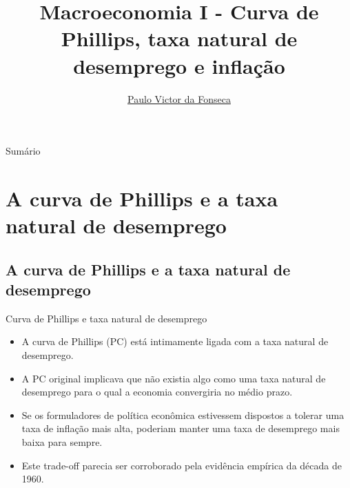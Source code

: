 \documentclass[10pt]{beamer}
\title[]{Macroeconomia I - Curva de Phillips, taxa natural de desemprego e inflação}
\author[]{\href{https://pvfonseca.github.io}{Paulo Victor da Fonseca}}
\date{}
\begin{document}
\begin{frame}[plain]
\end{frame}

\begin{frame}{Sumário}
    \tableofcontents
\end{frame}

\section{A curva de Phillips e a taxa natural de desemprego}
\subsection{A curva de Phillips e a taxa natural de desemprego}
\begin{frame}{Curva de Phillips e taxa natural de desemprego}
    \begin{itemize}
        \item A curva de Phillips (PC) está intimamente ligada com a taxa natural de desemprego.
        \bigskip
        \item A PC original implicava que não existia algo como uma taxa natural de desemprego para o qual a economia convergiria no médio prazo.
        \bigskip
        \item Se os formuladores de política econômica estivessem dispostos a tolerar uma taxa de inflação mais alta, poderiam manter uma taxa de desemprego mais baixa para sempre.
        \bigskip
        \item Este trade-off parecia ser corroborado pela evidência empírica da década de 1960.
    \end{itemize}
\end{frame}
\end{document}
